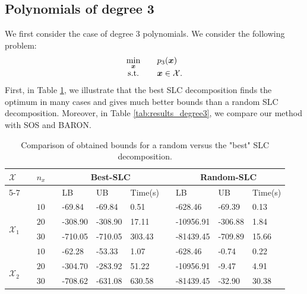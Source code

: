 \documentclass[opre,nonblindrev]{informs3} %
\begin{document}
\subsection{Polynomials of degree 3}
We first consider the case of degree 3 polynomials. We consider the following problem:
\begin{equation}
    \begin{array}{cll}
        \displaystyle \min_{\boldsymbol{x}} &\quad p_3(\boldsymbol{x}) \\
        {\rm s.t.} 	&\quad \boldsymbol{x} \in \mathcal{X}.
    \end{array} \label{eq:poly3_numexp_1}
\end{equation}     
{\color{black} First, in Table \ref{tab:results_degree3_decomp}, we illustrate that the best SLC decomposition finds the optimum in many cases and gives much better bounds than a random SLC decomposition.} Moreover, in Table \ref{tab:results_degree3}, we compare our method with SOS and BARON.

\begin{table}[t]   
    \centering
    \begin{tabular}{lclllllllll}
\hline
	\multirow{2}{*}{$\mathcal{X}$} & & \multirow{2}{*}{$n_x$} & &  \multicolumn{3}{c}{Best-SLC}  &  & \multicolumn{3}{c}{Random-SLC} \\ 
		\cline{5-7} \cline{9-11}
    	& & &  & LB & UB & Time(s)  &  & LB & UB & Time(s) \\ \hline \hline
         & & $10$ & & -69.84 & -69.84 & 0.51 & & -628.46 & -69.39 & 0.13 \\
	\multirow{2}{*}{$\mathcal{X}_1$} & & $20$ & & -308.90 & -308.90 & 17.11 & & -10956.91 & -306.88 & 1.84 \\
	 & & $30$ & & -710.05 & -710.05 & 303.43 & & -81439.45 & -709.89 & 15.66 \\
	\hline 
	& & $10$ & & -62.28 & -53.33 & 1.07 & & -628.46 & -0.74 & 0.22 \\
	\multirow{2}{*}{$\mathcal{X}_2$} & & $20$ & & -304.70 & -283.92 & 51.22 & & -10956.91 & -9.47 & 4.91 \\ 
	& & $30$ & & -708.62 & -631.08 & 630.58 & & -81439.45 & -32.90 & 30.38 \\
\hline
    \end{tabular}
    \caption{Comparison of obtained bounds for a random versus the "best" SLC decomposition. \label{tab:results_degree3_decomp}}
\end{table}   
\end{document}
